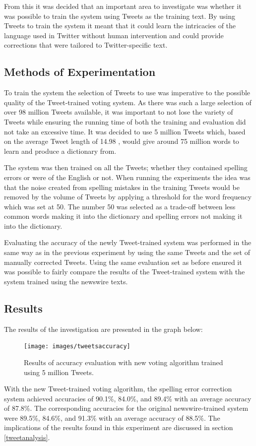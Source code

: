 From this it was decided that an important area to investigate was whether it was possible to train the system using Tweets as the training text. By using Tweets to train the system it meant that it could learn the intricacies of the language used in Twitter without human intervention and could provide corrections that were tailored to Twitter-specific text.

\subsection{Methods of Experimentation}
To train the system the selection of Tweets to use was imperative to the possible quality of the Tweet-trained voting system. As there was such a large selection of over 98 million Tweets available, it was important to not lose the variety of Tweets while ensuring the running time of both the training and evaluation did not take an excessive time. It was decided to use 5 million Tweets which, based on the average Tweet length of 14.98 \cite{}, would give around 75 million words to learn and produce a dictionary from.

The system was then trained on all the Tweets; whether they contained spelling errors or were of the English or not. When running the experiments the idea was that the noise created from spelling mistakes in the training Tweets would be removed by the volume of Tweets by applying a threshold for the word frequency which was set at 50. The number 50 was selected as a trade-off between less common words making it into the dictionary and spelling errors not making it into the dictionary.

Evaluating the accuracy of the newly Tweet-trained system was performed in the same way as in the previous experiment by using the same Tweets and the set of manually corrected Tweets. Using the same evaluation set as before ensured it was possible to fairly compare the results of the Tweet-trained system with the system trained using the newswire texts.

\subsection{Results}
The results of the investigation are presented in the graph below:
\begin{figure}[H]
	\centering
	\label{fig:tweetaccuracy}
	\texttt{[image: images/tweetsaccuracy]}
	\caption{Results of accuracy evaluation with new voting algorithm trained using 5 million Tweets.}
\end{figure}
With the new Tweet-trained voting algorithm, the spelling error correction system achieved accuracies of 90.1\%, 84.0\%, and 89.4\% with an average accuracy of 87.8\%. The corresponding accuracies for the original newswire-trained system were 89.5\%, 84.6\%, and 91.3\% with an average accuracy of 88.5\%. The implications of the results found in this experiment are discussed in section \ref{tweetanalysis}.

